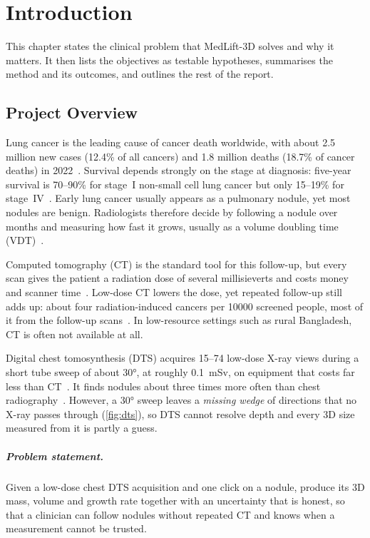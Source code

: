 \chapter{Introduction}
\label{ch:intro}

This chapter states the clinical problem that MedLift-3D solves and why it matters. It then lists the objectives as testable hypotheses, summarises the method and its outcomes, and outlines the rest of the report.

\section{Project Overview}

Lung cancer is the leading cause of cancer death worldwide, with about 2.5 million new cases (12.4\% of all cancers) and 1.8 million deaths (18.7\% of cancer deaths) in 2022~\cite{bray2024globocan}. Survival depends strongly on the stage at diagnosis: five-year survival is 70--90\% for stage~I non-small cell lung cancer but only 15--19\% for stage~IV~\cite{knight2017early}. Early lung cancer usually appears as a pulmonary nodule, yet most nodules are benign. Radiologists therefore decide by following a nodule over months and measuring how fast it grows, usually as a volume doubling time (VDT)~\cite{revel2004threed,horeweg2014nelson}.

Computed tomography (CT) is the standard tool for this follow-up, but every scan gives the patient a radiation dose of several millisieverts and costs money and scanner time~\cite{brenner2007ct}. Low-dose CT lowers the dose, yet repeated follow-up still adds up: about four radiation-induced cancers per \num{10000} screened people, most of it from the follow-up scans~\cite{rampinelli2017}. In low-resource settings such as rural Bangladesh, CT is often not available at all.

Digital chest tomosynthesis (DTS) acquires 15--74 low-dose X-ray views during a short tube sweep of about \ang{30}, at roughly \SI{0.1}{mSv}, on equipment that costs far less than CT~\cite{dobbins2003dts}. It finds nodules about three times more often than chest radiography~\cite{vikgren2008}. However, a \ang{30} sweep leaves a \emph{missing wedge} of directions that no X-ray passes through (\cref{fig:dts}), so DTS cannot resolve depth and every 3D size measured from it is partly a guess.

\paragraph{Problem statement.} Given a low-dose chest DTS acquisition and one click on a nodule, produce its 3D mass, volume and growth rate together with an uncertainty that is honest, so that a clinician can follow nodules without repeated CT and knows when a measurement cannot be trusted.

